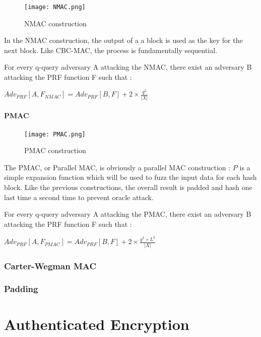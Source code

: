 \begin{figure}[h!]
	\centering
		\texttt{[image: NMAC.png]}
	\caption{NMAC construction}
	\label{fig:NMACConstruction}
\end{figure}

In the NMAC construction, the output of a a block is used as the key for the next block. Like CBC-MAC, the process is fundamentally sequential.


\begin{mytheorem}
	For every q-query adversary A attacking the NMAC, there exist an adversary B attacking the PRF function F such that : 
	\begin{flushright}
 		$Adv_{PRF}[A,F_{NMAC}] = Adv_{PRF}[B, F] + 2\times \frac{q^2}{|X|}$	
	\end{flushright}
\end{mytheorem}


\paragraph{PMAC}

\begin{figure}[h!]
	\centering
		\texttt{[image: PMAC.png]}
	\caption{PMAC construction}
	\label{fig:PMACConstruction}
\end{figure}

The PMAC, or Parallel MAC, is obviously a parallel MAC construction : $P$ is a simple expansion function which will be used to fuzz the input data for each hash block. Like the previous constructions, the overall result is padded and hash one last time a second time to prevent oracle attack.

\begin{mytheorem}
	For every q-query adversary A attacking the PMAC, there exist an adversary B attacking the PRF function F such that : 
	\begin{flushright}
 		$Adv_{PRF}[A,F_{PMAC}] = Adv_{PRF}[B, F] + 2\times \frac{q^2\times L^2}{|X|}$	
	\end{flushright}
\end{mytheorem}

\subsubsection{Carter-Wegman MAC}


\subsubsection{Padding}
\label{sec:ISOPadding}

\section{Authenticated Encryption}	

